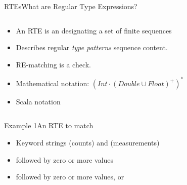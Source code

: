 \newsavebox\exnotebox
\begin{lrbox}{\exnotebox}
  \begin{minipage}{6.5cm}
    
  \end{minipage}
\end{lrbox}


\begin{frame}{RTEs}{What are Regular Type Expressions?}
  \begin{columns}
    \begin{column}{0.55\textwidth}
  \begin{itemize}
  \item An RTE is an  designating a set  of finite sequences
  \item Describes regular \emph{type patterns} sequence content.
  \item RE-matching is a  check.
  \item Mathematical notation: $(Int \cdot (Double \cup Float)^+)^*$
  \item Scala notation\\
    \usebox\exnotebox
  \end{itemize}
    \end{column}%
    \begin{column}{0.45\textwidth}
      \scalebox{0.7}{}
    \end{column}%
  \end{columns}%
\end{frame}


\newsavebox\exampleAbox
\begin{lrbox}{\exampleAbox}
  \begin{minipage}{12cm}
    
  \end{minipage}
\end{lrbox}



\begin{frame}{Example 1}{An RTE to match}
  \usebox\exampleAbox

  \begin{itemize}
  \item Keyword strings  (counts) and  (measurements)
  \item {} followed by zero or more  values
  \item {} followed by zero or more values,  or 
  \end{itemize}
\end{frame}


